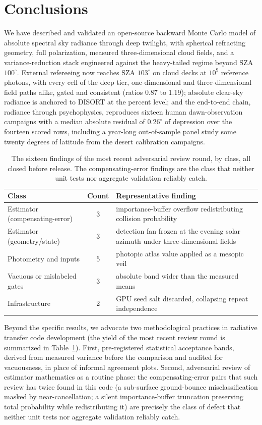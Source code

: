 \documentclass[preprint,12pt]{elsarticle}
\begin{document}
\section{Conclusions}
\label{sec:conclusion}

We have described and validated an open-source backward Monte Carlo model
of absolute spectral sky radiance through deep twilight, with spherical
refracting geometry, full polarization, measured three-dimensional cloud
fields, and a variance-reduction stack engineered against the
heavy-tailed regime beyond SZA $100^\circ$. External refereeing now
reaches SZA $103^\circ$ on cloud decks at $10^9$ reference photons,
with every cell of the deep tier, one-dimensional and
three-dimensional field paths alike, gated and consistent (ratios
0.87 to 1.19);
absolute clear-sky radiance is anchored to DISORT at the percent level;
and the end-to-end chain, radiance through psychophysics, reproduces
sixteen human dawn-observation campaigns with a median absolute residual
of $0.26^\circ$ of depression over the fourteen scored rows, including a
year-long out-of-sample panel
study some twenty degrees of latitude from the desert calibration
campaigns.

\begin{table}[t]
\centering
\caption{The sixteen findings of the most recent adversarial review
round, by class, all closed before release. The compensating-error
findings are the class that neither unit tests nor aggregate validation
reliably catch.}
\label{tab:review}
\small
\setlength{\tabcolsep}{4pt}
\begin{tabular}{p{4.2cm}cp{6.6cm}}
\toprule
Class & Count & Representative finding \\
\midrule
Estimator (compensating-error) & 3 & importance-buffer overflow redistributing collision probability \\
Estimator (geometry/state) & 3 & detection fan frozen at the evening solar azimuth under three-dimensional fields \\
Photometry and inputs & 5 & photopic atlas value applied as a mesopic veil \\
Vacuous or mislabeled gates & 3 & absolute band wider than the measured means \\
Infrastructure & 2 & GPU seed salt discarded, collapsing repeat independence \\
\bottomrule
\end{tabular}
\end{table}

Beyond the specific results, we advocate two methodological
practices in radiative transfer code development (the yield of the
most recent review round is summarized in Table~\ref{tab:review}). First, pre-registered
statistical acceptance bands, derived from measured variance before the
comparison and audited for vacuousness, in place of informal agreement
plots. Second, adversarial review of estimator mathematics as a routine
phase: the compensating-error pairs that such review has twice found in
this code (a sub-surface ground-bounce misclassification masked by
near-cancellation; a silent importance-buffer truncation preserving total
probability while redistributing it) are precisely the class of defect
that neither unit tests nor aggregate validation reliably catch.
\end{document}
